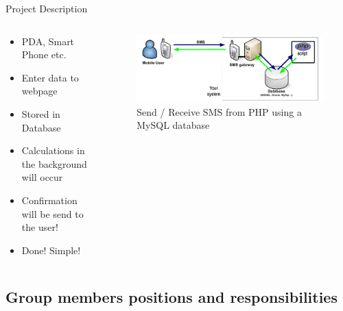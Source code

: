 \documentclass[xcolor=pdftex,dvipsnames,table]{beamer}
\begin{document}
\begin{frame}{Project Description}
    \begin{columns}[t] %
      \begin{column}[T]{5cm} %
        \begin{itemize}
            \item<+-| alert@+> PDA, Smart Phone etc.
            \item<+-| alert@+> Enter data to webpage
            \item<+-| alert@+> Stored in Database
            \item<+-| alert@+> Calculations in the background will occur
            \item<+-| alert@+> Confirmation will be send to the user!
            \item<+-| alert@+> Done! Simple!
          \end{itemize}  
      \end{column}
    \begin{column}[T]{5cm} %
      \begin{figure}
        \centerline{\includegraphics[scale=0.28]{SMS}}
        \vspace*{10pt}
        \captionsetup{justification=centering} %
        \caption{Send / Receive SMS from PHP using a MySQL database}%
      \end{figure}
    \end{column}
  \end{columns}
\end{frame}

  \subsection{Group members positions and responsibilities}
\end{document}
